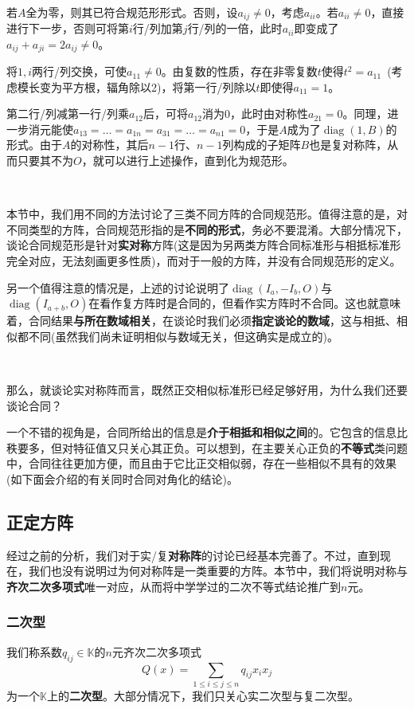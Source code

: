 \documentclass[a4paper,UTF8,fontset=windows]{ctexart}
\DeclareMathOperator{\diag}{diag}
\begin{document}
\

若$A$全为零，则其已符合规范形形式。否则，设$a_{ij}\ne0$，考虑$a_{ii}$。若$a_{ii}\ne0$，直接进行下一步，否则可将第$i$行/列加第$j$行/列的一倍，此时$a_{ii}$即变成了$a_{ij}+a_{ji}=2a_{ij}\ne0$。

将$1,i$两行/列交换，可使$a_{11}\ne0$。由复数的性质，存在非零复数$t$使得$t^2=a_{11}$\ (考虑模长变为平方根，辐角除以2)，将第一行/列除以$t$即使得$a_{11}=1$。

第二行/列减第一行/列乘$a_{12}$后，可将$a_{12}$消为0，此时由对称性$a_{21}=0$。同理，进一步消元能使$a_{13}=\dots=a_{1n}=a_{31}=\dots=a_{n1}=0$，于是$A$成为了$\diag(1,B)$的形式。由于$A$的对称性，其后$n-1$行、$n-1$列构成的子矩阵$B$也是复对称阵，从而只要其不为$O$，就可以进行上述操作，直到化为规范形。

\

本节中，我们用不同的方法讨论了三类不同方阵的合同规范形。值得注意的是，对不同类型的方阵，合同规范形指的是\textbf{不同的形式}，务必不要混淆。大部分情况下，谈论合同规范形是针对\textbf{实对称}方阵(这是因为另两类方阵合同标准形与相抵标准形完全对应，无法刻画更多性质)，而对于一般的方阵，并没有合同规范形的定义。

另一个值得注意的情况是，上述的讨论说明了$\diag(I_a,-I_b,O)$与$\diag(I_{a+b},O)$在看作复方阵时是合同的，但看作实方阵时不合同。这也就意味着，合同结果\textbf{与所在数域相关}，在谈论时我们必须\textbf{指定谈论的数域}，这与相抵、相似都不同(虽然我们尚未证明相似与数域无关，但这确实是成立的)。

\

那么，就谈论实对称阵而言，既然正交相似标准形已经足够好用，为什么我们还要谈论合同？

一个不错的视角是，合同所给出的信息是\textbf{介于相抵和相似之间}的。它包含的信息比秩要多，但对特征值又只关心其正负。可以想到，在主要关心正负的\textbf{不等式}类问题中，合同往往更加方便，而且由于它比正交相似弱，存在一些相似不具有的效果(如下面会介绍的有关同时合同对角化的结论)。

\subsection{正定方阵}
经过之前的分析，我们对于实/复\textbf{对称阵}的讨论已经基本完善了。不过，直到现在，我们也没有说明过为何对称阵是一类重要的方阵。本节中，我们将说明对称与\textbf{齐次二次多项式}唯一对应，从而将中学学过的二次不等式结论推广到$n$元。

\subsubsection{二次型}
我们称系数$q_{ij}\in\mathbb{K}$的$n$元齐次二次多项式
$$Q(x)=\sum_{1\le i\le j\le n}q_{ij}x_ix_j$$
为一个$\mathbb{K}$上的\textbf{二次型}。大部分情况下，我们只关心实二次型与复二次型。
\end{document}
